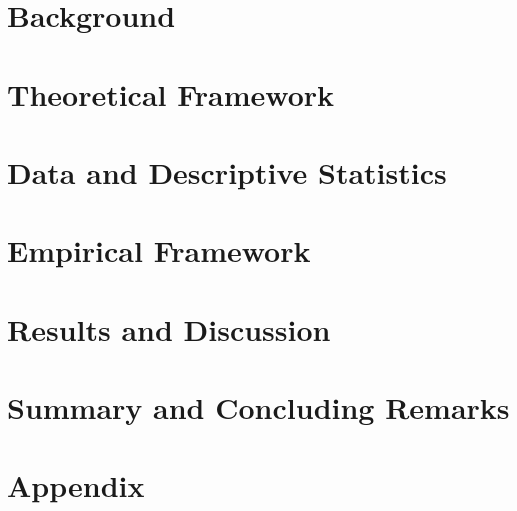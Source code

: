 \documentclass[12pt]{article}
\begin{document}
\section{Background} \label{background}


\section{Theoretical Framework} \label{theoretical}


\section{Data and Descriptive Statistics} \label{data}


\section{Empirical Framework} \label{emprical}

\section{Results and Discussion} \label{results}

\section{Summary and Concluding Remarks} \label{conclusion}









\newpage


% 
%



\section{Appendix}
\end{document}

